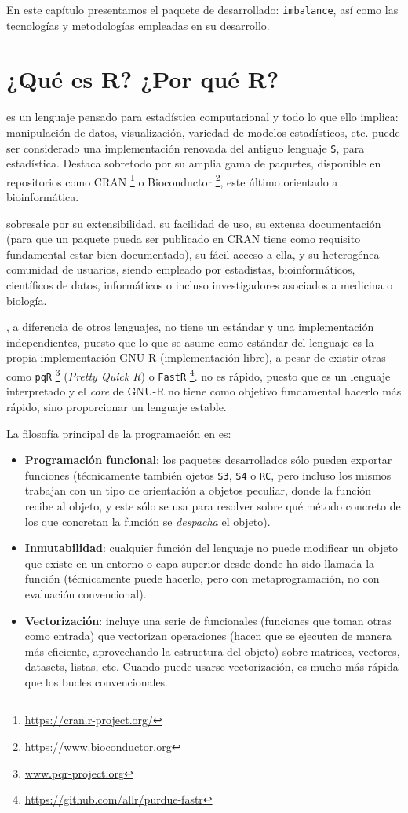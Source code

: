 En este capítulo presentamos el paquete de \R desarrollado: \texttt{imbalance}, así como las tecnologías y 
metodologías empleadas en su desarrollo.

\section{¿Qué es R? ¿Por qué R?}
 es un lenguaje pensado para estadística computacional y todo lo que ello implica: 
manipulación de datos, visualización, variedad de modelos estadísticos, etc. \R puede ser considerado una 
implementación renovada del antiguo lenguaje \texttt{S}, para estadística. Destaca sobretodo por su amplia gama de
paquetes, disponible en repositorios como CRAN \footnote{\url{https://cran.r-project.org/}} o 
Bioconductor \footnote{\url{https://www.bioconductor.org}}, este último orientado a bioinformática.

\R sobresale por su extensibilidad, su facilidad de uso, su extensa documentación (para que un paquete pueda ser
publicado en CRAN tiene como requisito fundamental estar bien documentado), su fácil acceso a ella,
y su heterogénea comunidad de usuarios, siendo empleado por estadistas, bioinformáticos, científicos
de datos, informáticos o incluso investigadores asociados a medicina o biología.

\R, a diferencia de otros lenguajes, no tiene un estándar y una implementación independientes, puesto que lo que se
asume como estándar del lenguaje es la propia implementación GNU-R (implementación libre), a pesar de existir otras 
como \texttt{pqR} \footnote{\url{www.pqr-project.org}} (\textit{Pretty Quick R}) o 
\texttt{FastR} \footnote{\url{https://github.com/allr/purdue-fastr}}. \R no es rápido, puesto que es un 
lenguaje interpretado y el \textit{core} de GNU-R no tiene como objetivo fundamental hacerlo más rápido, sino
proporcionar un lenguaje estable. 

La filosofía principal de la programación en \R es:

\begin{itemize}
  \item \textbf{Programación funcional}: los paquetes desarrollados sólo pueden exportar funciones (técnicamente
  también ojetos \texttt{S3}, \texttt{S4} o \texttt{RC}, pero incluso los mismos trabajan con un tipo de orientación
  a objetos peculiar, donde la función recibe al objeto, y este sólo se usa para resolver sobre qué método concreto
  de los que concretan la función se \textit{despacha} el objeto).
  \item \textbf{Inmutabilidad}: cualquier función del lenguaje no puede modificar un objeto que existe en
  un entorno o capa superior desde donde ha sido llamada la función (técnicamente puede hacerlo, pero con metaprogramación,
  no con evaluación convencional).
  \item \textbf{Vectorización}: \R incluye una serie de funcionales (funciones que toman otras como entrada) 
  que vectorizan operaciones (hacen que se ejecuten de manera más eficiente, aprovechando la estructura del objeto)
  sobre matrices, vectores, datasets, listas, etc. Cuando puede usarse vectorización, es mucho más
  rápida que los bucles convencionales.
\end{itemize}

